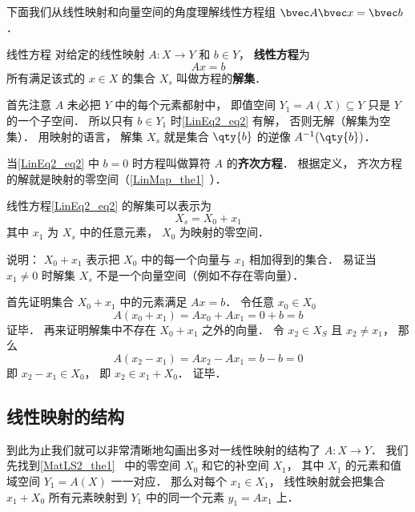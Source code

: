 

下面我们从线性映射和向量空间的角度理解线性方程组 $\bvec A \bvec x = \bvec b$．


\begin{definition}{线性方程}
对给定的线性映射 $A:X\to Y$ 和 $b \in Y$， \textbf{线性方程}为
\begin{equation}\label{LinEq2_eq2}
Ax = b
\end{equation}
所有满足该式的 $x \in X$ 的集合 $X_s$ 叫做方程的\textbf{解集}．
\end{definition}

首先注意 $A$ 未必把 $Y$ 中的每个元素都射中， 即值空间 $Y_1 = A(X) \subseteq Y$ 只是 $Y$ 的一个子空间． 所以只有 $b \in Y_1$ 时\autoref{LinEq2_eq2} 有解， 否则无解（解集为空集）． 用映射的语言， 解集 $X_s$ 就是集合 $\qty{b}$ 的逆像 $A^{-1}(\qty{b})$．

当\autoref{LinEq2_eq2} 中 $b = 0$ 时方程叫做算符 $A$ 的\textbf{齐次方程}． 根据定义， 齐次方程的解就是映射的零空间（\autoref{LinMap_the1}~）．

\begin{theorem}{}\label{LinEq2_the1}
线性方程\autoref{LinEq2_eq2} 的解集可以表示为
\begin{equation}\label{LinEq2_eq1}
X_s = X_0 + x_1
\end{equation}
其中 $x_1$ 为 $X_s$ 中的任意元素，  $X_0$ 为映射的零空间．
\end{theorem}
说明： $X_0 + x_1$ 表示把 $X_0$ 中的每一个向量与 $x_1$ 相加得到的集合． 易证当 $x_1 \ne 0$ 时解集 $X_s$ 不是一个向量空间（例如不存在零向量）．

首先证明集合 $X_0 + x_1$ 中的元素满足 $Ax = b$． 令任意 $x_0 \in X_0$
\begin{equation}
A(x_0 + x_1) = Ax_0 + Ax_1 = 0 + b = b
\end{equation}
证毕． 再来证明解集中不存在 $X_0 + x_1$ 之外的向量． 令 $x_2 \in X_S$ 且 $x_2 \ne x_1$， 那么
\begin{equation}
A(x_2 - x_1) = Ax_2 - Ax_1 = b - b = 0
\end{equation}
即 $x_2 - x_1 \in X_0$， 即 $x_2 \in x_1 + X_0$． 证毕．

\subsection{线性映射的结构}
到此为止我们就可以非常清晰地勾画出多对一线性映射的结构了 $A:X\to Y$． 我们先找到\autoref{MatLS2_the1}~ 中的零空间 $X_0$ 和它的补空间 $X_1$， 其中 $X_1$ 的元素和值域空间 $Y_1 = A(X)$ 一一对应． 那么对每个 $x_1 \in X_1$， 线性映射就会把集合 $x_1 + X_0$ 所有元素映射到 $Y_1$ 中的同一个元素 $y_1 = Ax_1$ 上．

